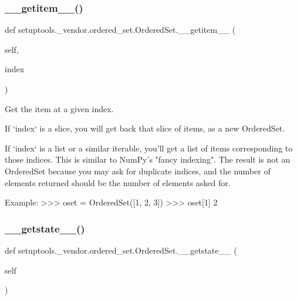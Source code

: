 \subsubsection{\texorpdfstring{\+\_\+\+\_\+getitem\+\_\+\+\_\+()}{\_\_getitem\_\_()}}
{\footnotesize\ttfamily def setuptools.\+\_\+vendor.\+ordered\+\_\+set.\+Ordered\+Set.\+\_\+\+\_\+getitem\+\_\+\+\_\+ (\begin{DoxyParamCaption}\item[{}]{self,  }\item[{}]{index }\end{DoxyParamCaption})}

\begin{DoxyVerb}Get the item at a given index.

If `index` is a slice, you will get back that slice of items, as a
new OrderedSet.

If `index` is a list or a similar iterable, you'll get a list of
items corresponding to those indices. This is similar to NumPy's
"fancy indexing". The result is not an OrderedSet because you may ask
for duplicate indices, and the number of elements returned should be
the number of elements asked for.

Example:
    >>> oset = OrderedSet([1, 2, 3])
    >>> oset[1]
    2
\end{DoxyVerb}
 \mbox{\label{classsetuptools_1_1__vendor_1_1ordered__set_1_1OrderedSet_ab9a88d5c860fe783c39fb66b8003351c}} 
\subsubsection{\texorpdfstring{\+\_\+\+\_\+getstate\+\_\+\+\_\+()}{\_\_getstate\_\_()}}
{\footnotesize\ttfamily def setuptools.\+\_\+vendor.\+ordered\+\_\+set.\+Ordered\+Set.\+\_\+\+\_\+getstate\+\_\+\+\_\+ (\begin{DoxyParamCaption}\item[{}]{self }\end{DoxyParamCaption})}

\mbox{\label{classsetuptools_1_1__vendor_1_1ordered__set_1_1OrderedSet_a3238ae7179a07f6e984b517f9ea91b33}} 
